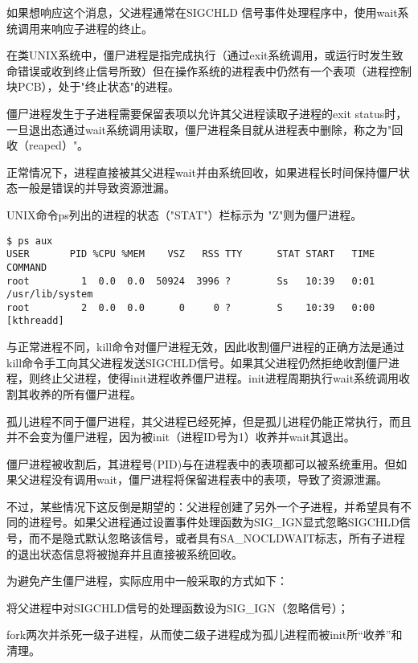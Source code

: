 如果想响应这个消息，父进程通常在SIGCHLD 信号事件处理程序中，使用wait系统调用来响应子进程的终止。




在类UNIX系统中，僵尸进程是指完成执行（通过exit系统调用，或运行时发生致命错误或收到终止信号所致）但在操作系统的进程表中仍然有一个表项（进程控制块PCB），处于"终止状态"的进程。


僵尸进程发生于子进程需要保留表项以允许其父进程读取子进程的exit status时，一旦退出态通过wait系统调用读取，僵尸进程条目就从进程表中删除，称之为"回收（reaped）"。

正常情况下，进程直接被其父进程wait并由系统回收，如果进程长时间保持僵尸状态一般是错误的并导致资源泄漏。

UNIX命令ps列出的进程的状态（"STAT"）栏标示为 "Z"则为僵尸进程。

\begin{verbatim}
$ ps aux
USER       PID %CPU %MEM    VSZ   RSS TTY      STAT START   TIME COMMAND
root         1  0.0  0.0  50924  3996 ?        Ss   10:39   0:01 /usr/lib/system
root         2  0.0  0.0      0     0 ?        S    10:39   0:00 [kthreadd]
\end{verbatim}



与正常进程不同，kill命令对僵尸进程无效，因此收割僵尸进程的正确方法是通过kill命令手工向其父进程发送SIGCHLD信号。如果其父进程仍然拒绝收割僵尸进程，则终止父进程，使得init进程收养僵尸进程。init进程周期执行wait系统调用收割其收养的所有僵尸进程。

孤儿进程不同于僵尸进程，其父进程已经死掉，但是孤儿进程仍能正常执行，而且并不会变为僵尸进程，因为被init（进程ID号为1）收养并wait其退出。

僵尸进程被收割后，其进程号(PID)与在进程表中的表项都可以被系统重用。但如果父进程没有调用wait，僵尸进程将保留进程表中的表项，导致了资源泄漏。

不过，某些情况下这反倒是期望的：父进程创建了另外一个子进程，并希望具有不同的进程号。如果父进程通过设置事件处理函数为SIG\_IGN显式忽略SIGCHLD信号，而不是隐式默认忽略该信号，或者具有SA\_NOCLDWAIT标志，所有子进程的退出状态信息将被抛弃并且直接被系统回收。

为避免产生僵尸进程，实际应用中一般采取的方式如下：

\begin{compactitem}
\item 将父进程中对SIGCHLD信号的处理函数设为SIG\_IGN（忽略信号）；
\item fork两次并杀死一级子进程，从而使二级子进程成为孤儿进程而被init所“收养”和清理。
\end{compactitem}


